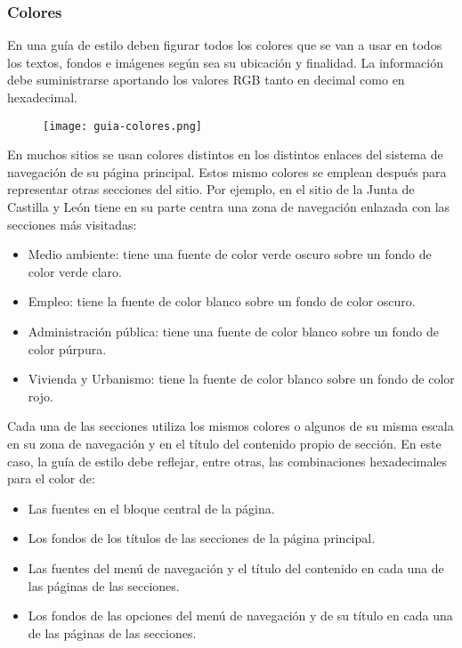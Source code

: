 \subsubsection{Colores}
En una guía de estilo deben figurar todos los colores que se van a usar en todos los textos, fondos e imágenes según sea su ubicación y finalidad. La información debe suministrarse aportando los valores RGB tanto en decimal como en hexadecimal.

\begin{figure}[H]
    \centering
    \texttt{[image: guia-colores.png]}
\end{figure}

En muchos sitios se usan colores distintos en los distintos enlaces del sistema de navegación de su página principal. Estos mismo colores se emplean después para representar otras secciones del sitio. Por ejemplo, en el sitio de la Junta de Castilla  y León tiene en su parte centra una zona de navegación enlazada con las secciones más visitadas:

\begin{itemize}
    \item Medio ambiente: tiene una fuente de color verde oscuro sobre un fondo de color verde claro.
    \item Empleo: tiene la fuente de color blanco sobre un fondo de color oscuro.
    \item Administración pública: tiene una fuente de color blanco sobre un fondo de color púrpura.
    \item Vivienda y Urbanismo: tiene la fuente de color blanco sobre un fondo de color rojo.
\end{itemize}

Cada una de las secciones utiliza los mismos colores o algunos de su misma escala en su zona de navegación y en el título del contenido propio de sección. En este caso, la guía de estilo debe reflejar, entre otras, las combinaciones hexadecimales para el color de:

\begin{itemize}
    \item Las fuentes en el bloque central de la página.
    \item Los fondos de los títulos de las secciones de la página principal.
    \item Las fuentes del menú de navegación y el título del contenido en cada una de las páginas de las secciones.
    \item Los fondos de las opciones del menú de navegación y de su título en cada una de las páginas de las secciones.
\end{itemize}

